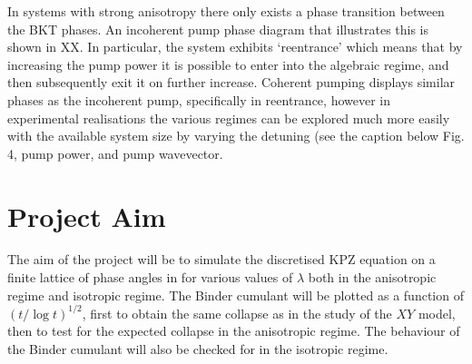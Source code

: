 In systems with strong anisotropy there only exists a phase transition between the BKT phases. An incoherent pump phase diagram that illustrates this is shown in XX. In particular, the system exhibits ‘reentrance’ which means that by increasing the pump power it is possible to enter into the algebraic regime, and then subsequently exit it on further increase. Coherent pumping displays similar phases as the incoherent pump, specifically in reentrance, however in experimental realisations the various regimes can be explored much more easily with the available system size by varying the detuning (see the caption below Fig. 4, pump power, and pump wavevector. 

\section{Project Aim}

The aim of the project will be to simulate the discretised KPZ equation on a finite lattice of phase angles in for various values of $\lambda$ both in the anisotropic regime and isotropic regime. The Binder cumulant will be plotted as a function of $(t/\log t)^{1/2}$, first to obtain the same collapse as in the study of the $XY$ model, then to test for the expected collapse in the anisotropic regime. The behaviour of the Binder cumulant will also be checked for in the isotropic regime. 

